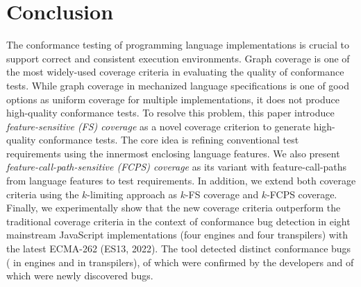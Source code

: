 \section{Conclusion}\label{sec:conclusion}

The conformance testing of programming language implementations is crucial to
support correct and consistent execution environments.
%
Graph coverage is one of the most widely-used coverage criteria in evaluating
the quality of conformance tests.
%
While graph coverage in mechanized language specifications is one of good
options as uniform coverage for multiple implementations, it does not produce
high-quality conformance tests.
%
To resolve this problem, this paper introduce \textit{feature-sensitive (FS)
coverage} as a novel coverage criterion to generate high-quality conformance
tests.
%
The core idea is refining conventional test requirements using the innermost
enclosing language features.
%
We also present \textit{feature-call-path-sensitive (FCPS) coverage} as its
variant with feature-call-paths from language features to test requirements.
%
In addition, we extend both coverage criteria using the $k$-limiting approach as
$k$-FS coverage and $k$-FCPS coverage.
%
Finally, we experimentally show that the new coverage criteria outperform the
traditional coverage criteria in the context of conformance bug detection in
eight mainstream JavaScript implementations (four engines and four transpilers)
with the latest ECMA-262 (ES13, 2022).
%
The tool detected  distinct conformance bugs ( in engines
and  in transpilers),  of which were confirmed by the
developers and  of which were newly discovered bugs.

